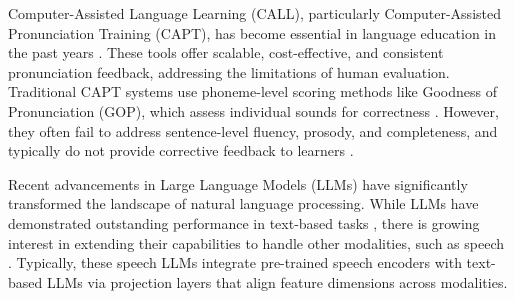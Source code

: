 \documentclass{Interspeech}
\begin{document}
Computer-Assisted Language Learning (CALL), particularly Computer-Assisted Pronunciation Training (CAPT), has become essential in language education in the past years \cite{tejedor2020design}. These tools offer scalable, cost-effective, and consistent pronunciation feedback, addressing the limitations of human evaluation. Traditional CAPT systems use phoneme-level scoring methods like Goodness of Pronunciation (GOP), which assess individual sounds for correctness \cite{witt2000phone}. However, they often fail to address sentence-level fluency, prosody, and completeness, and typically do not provide corrective feedback to learners \cite{gong2022transformer}.

Recent advancements in Large Language Models (LLMs) have significantly transformed the landscape of natural language processing. While LLMs have demonstrated outstanding performance in text-based tasks \cite{adeshola2024opportunities}, there is growing interest in extending their capabilities to handle other modalities, such as speech \cite{tang2023salmonn,li2024audio}. Typically, these speech LLMs integrate pre-trained speech encoders with text-based LLMs via projection layers that align feature dimensions across modalities\cite{wu2024prompting}. 
\end{document}

